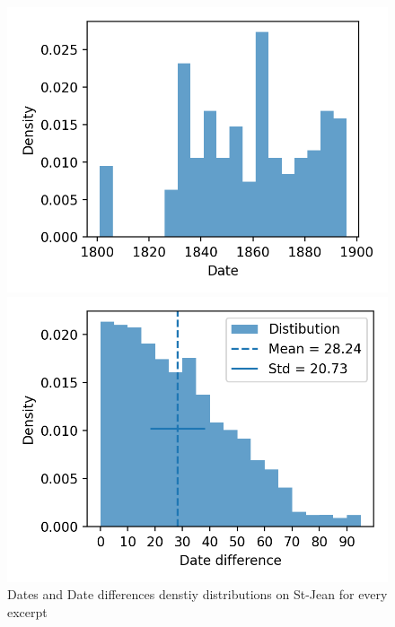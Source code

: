 \begin{figure}
  \centering
  \caption{Dates and Date differences denstiy distributions on St-Jean for every excerpt}

  \label{fig:dates_distribution}
  \includegraphics[width=\linewidth]{img/dates_distribution.png}

  \label{fig:dates_differences_all}
  \includegraphics[width=\linewidth]{img/dates_differences_all.png}
\end{figure}

